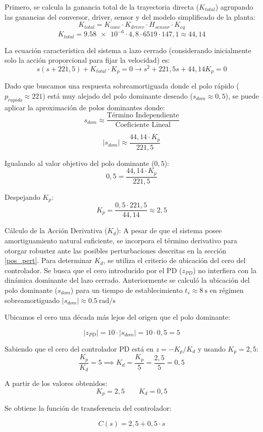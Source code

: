 Primero, se calcula la ganancia total de la trayectoria directa ($K_{total}$) agrupando las ganancias del conversor, driver, sensor y del modelo simplificado de la planta: 
\[
K_{total} = K_{conv} \cdot K_{driver} \cdot H_{sensor} \cdot K_{eq}
\]
\[
K_{total} = \num{9,58e-6} \cdot 4,8 \cdot 6519 \cdot 147,1 \approx 44,14
\]

La ecuación característica del sistema a lazo cerrado (considerando inicialmente solo la acción proporcional para fijar la velocidad) es:
\[
s(s + 221,5) + K_{total} \cdot K_p = 0 \rightarrow s^2 + 221,5 s + 44,14 K_p = 0
\]

Dado que buscamos una respuesta sobreamortiguada donde el polo rápido ($p_{rapido} \approx 221$) está muy alejado del polo dominante deseado ($s_{dom} \approx 0,5$), se puede aplicar la aproximación de polos dominantes donde:
\[
s_{dom} \approx \frac{\text{Término Independiente}}{\text{Coeficiente Lineal}}
\]

\[
|s_{dom}| \approx \frac{44,14 \cdot K_p}{221,5}
\]

Igualando al valor objetivo del polo dominante ($0,5$):
\[
0,5 = \frac{44,14 \cdot K_p}{221,5}
\]

Despejando $K_p$:
\[
K_p = \frac{0,5 \cdot 221,5}{44,14} \approx {2,5}
\]

Cálculo de la Acción Derivativa ($K_d$): A pesar de que el sistema posee amortiguamiento natural suficiente, se incorpora el término derivativo para otorgar robustez ante las posibles perturbaciones descritas en la sección \ref{pos_pert}. Para determinar $K_d$, se utiliza el criterio de ubicación del cero del controlador. Se busca que el cero introducido por el PD ($z_{PD}$) no interfiera con la dinámica dominante del lazo cerrado. Anteriormente se calculó la ubicación del polo dominante ($s_{dom}$) para un tiempo de establecimiento $t_s \approx \SI{8}{\second}$  en régimen sobreamortiguado $|s_{dom}| \approx \SI{0,5}{\radian\per\second}$

Ubicamos el cero una década más lejos del origen que el polo dominante:

\[
|z_{PD}| = 10 \cdot |s_{dom}| = 10 \cdot 0,5 = 5
\]

Sabiendo que el cero del controlador PD está en $z = -K_p/K_d$ y usando $K_p = 2,5$:
\[
\frac{K_p}{K_d} = 5 \implies K_d = \frac{K_p}{5} = \frac{2,5}{5} = 0,5
\]


A partir de los valores obtenidos:
$$K_p = 2,5 \qquad K_d = 0,5$$

Se obtiene la función de transferencia del controlador:

$$C(s) = 2,5 + 0,5 \cdot s$$
